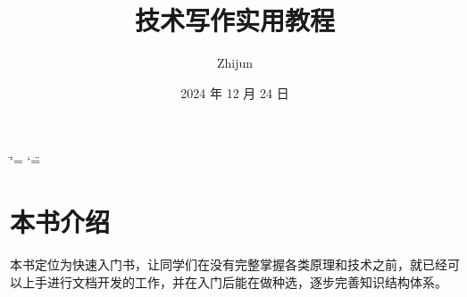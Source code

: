 \documentclass[letterpaper,10pt,english]{sphinxmanual}
\title{技术写作实用教程}
\date{2024 年 12 月 24 日}
\author{Zhijun}
\begin{document}
\ifdefined\shorthandoff
  \ifnum\catcode`\=\string=\active\shorthandoff{=}\fi
  \ifnum\catcode`\"=\active{}\fi
\fi

\pagestyle{empty}
\sphinxmaketitle
\pagestyle{plain}
\sphinxtableofcontents
\pagestyle{normal}
\label{\detokenize{index::doc}}


\sphinxstepscope


\chapter{本书介绍}
\label{\detokenize{about/about:id1}}\label{\detokenize{about/about::doc}}
\sphinxAtStartPar
本书定位为快速入门书，让同学们在没有完整掌握各类原理和技术之前，就已经可以上手进行文档开发的工作，并在入门后能在做种选，逐步完善知识结构体系。

\sphinxstepscope
\end{document}
